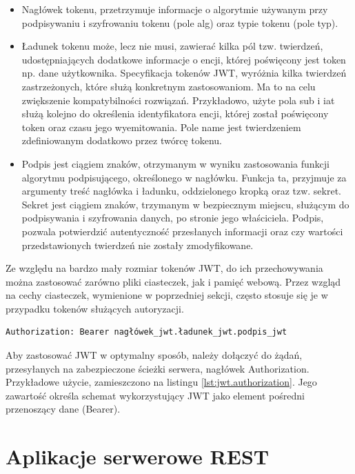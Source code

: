 \begin{itemize}
    \item Nagłówek tokenu, przetrzymuje informacje o algorytmie używanym przy podpisywaniu i szyfrowaniu tokenu (pole alg) oraz typie tokenu (pole typ).
    \item Ładunek tokenu może, lecz nie musi, zawierać kilka pól tzw. twierdzeń, udostępniających dodatkowe informacje o encji, której poświęcony jest token np. dane użytkownika. Specyfikacja tokenów JWT, wyróżnia kilka twierdzeń zastrzeżonych, które służą konkretnym zastosowaniom. Ma to na celu zwiększenie kompatybilności rozwiązań. Przykładowo, użyte pola sub i iat służą kolejno do określenia identyfikatora encji, której został poświęcony token oraz czasu jego wyemitowania. Pole name jest twierdzeniem zdefiniowanym dodatkowo przez twórcę tokenu.
    \item Podpis jest ciągiem znaków, otrzymanym w wyniku zastosowania funkcji algorytmu podpisującego, określonego w nagłówku. Funkcja ta, przyjmuje za argumenty treść nagłówka i ładunku, oddzielonego kropką oraz tzw. sekret. Sekret jest ciągiem znaków, trzymanym w bezpiecznym miejscu, służącym do podpisywania i szyfrowania danych, po stronie jego właściciela. Podpis, pozwala potwierdzić autentyczność przesłanych informacji oraz czy wartości przedstawionych twierdzeń nie zostały zmodyfikowane.
\end{itemize}

Ze względu na bardzo mały rozmiar tokenów JWT, do ich przechowywania można zastosować zarówno pliki ciasteczek, jak i pamięć webową. Przez wzgląd na cechy ciasteczek, wymienione w poprzedniej sekcji, często stosuje się je w przypadku tokenów służących autoryzacji.

\begin{lstlisting}[caption=Użycie tokenu JWT jako mechanizm autoryzacji w żądaniu HTTP, label=lst:jwt.authorization]
Authorization: Bearer nagłówek_jwt.ładunek_jwt.podpis_jwt
\end{lstlisting}

Aby zastosować JWT w optymalny sposób, należy dołączyć do żądań, przesyłanych na zabezpieczone ścieżki serwera, nagłówek Authorization. Przykładowe użycie, zamieszczono na listingu \ref{lst:jwt.authorization}. Jego zawartość określa schemat wykorzystujący JWT jako element pośredni przenoszący dane (Bearer). 

\section{Aplikacje serwerowe REST}

